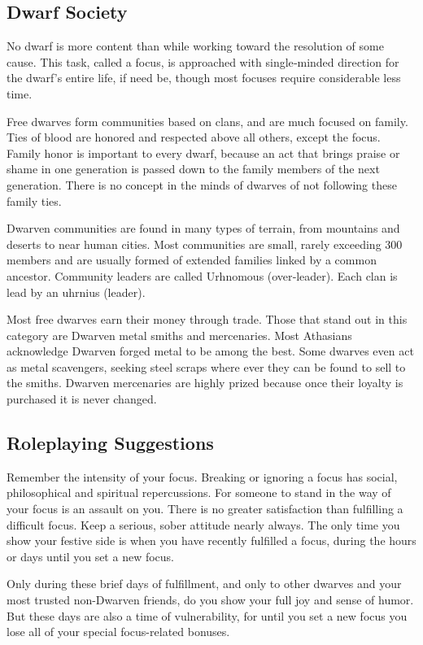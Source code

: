 \subsection{Dwarf Society}
No dwarf is more content than while working toward the resolution of some cause. This task, called a focus, is approached with single‐minded direction for the dwarf's entire life, if need be, though most focuses require considerable less time.

Free dwarves form communities based on clans, and are much focused on family. Ties of blood are honored and respected above all others, except the focus. Family honor is important to every dwarf, because an act that brings praise or shame in one generation is passed down to the family members of the next generation. There is no concept in the minds of dwarves of not following these family ties.

Dwarven communities are found in many types of terrain, from mountains and deserts to near human cities. Most communities are small, rarely exceeding 300 members and are usually formed of extended families linked by a common ancestor. Community leaders are called Urhnomous (over‐leader). Each clan is lead by an uhrnius (leader).

Most free dwarves earn their money through trade. Those that stand out in this category are Dwarven metal smiths and mercenaries. Most Athasians acknowledge Dwarven forged metal to be among the best. Some dwarves even act as metal scavengers, seeking steel scraps where ever they can be found to sell to the smiths. Dwarven mercenaries are highly prized because once their loyalty is purchased it is never changed.

\subsection{Roleplaying Suggestions}
Remember the intensity of your focus. Breaking or ignoring a focus has social, philosophical and spiritual repercussions. For someone to stand in the way of your focus is an assault on you. There is no greater satisfaction than fulfilling a difficult focus. Keep a serious, sober attitude nearly always. The only time you show your festive side is when you have recently fulfilled a focus, during the hours or days until you set a new focus.

Only during these brief days of fulfillment, and only to other dwarves and your most trusted non-Dwarven friends, do you show your full joy and sense of humor. But these days are also a time of vulnerability, for until you set a new focus you lose all of your special focus-related bonuses.

